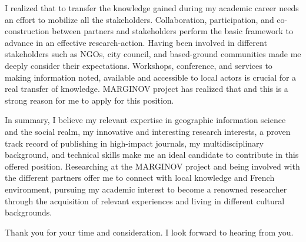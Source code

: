 
I realized that to transfer the knowledge gained during my academic career needs an effort to mobilize all the stakeholders. Collaboration, participation, and co-construction between partners and stakeholders perform the basic framework to advance in an effective research-action. Having been involved in different stakeholders such as NGOs, city council, and based-ground communities made me deeply consider their expectations. Workshops, conference, and services to making information noted, available and accessible to local actors is crucial for a real transfer of knowledge. MARGINOV project has realized that and this is a strong reason for me to apply for this position.\par



In summary, I believe my relevant expertise in geographic information science and the social realm, my innovative and interesting research interests, a proven track record of publishing in high-impact journals, my multidisciplinary background, and technical skills make me an ideal candidate to contribute in this offered position. Researching at the MARGINOV project and being involved with the different partners offer me to connect with local knowledge and French environment, pursuing my academic interest to become a renowned researcher through the acquisition of relevant experiences and living in different cultural backgrounds.\par

Thank you for your time and consideration. I look forward to hearing from you.\par




